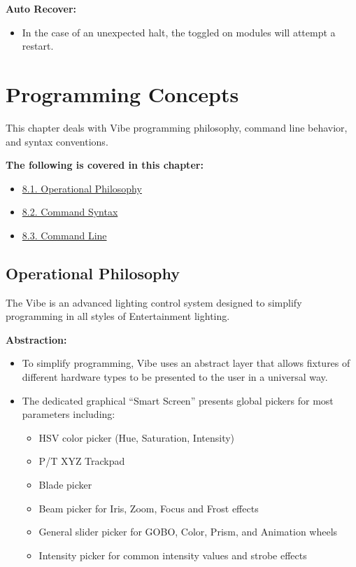 \documentclass[
]{article}
\providecommand{\tightlist}{%
  \setlength{\itemsep}{0pt}\setlength{\parskip}{0pt}}
\begin{document}
\textbf{Auto Recover:}

\begin{itemize}
\tightlist
\item
  In the case of an unexpected halt, the toggled on modules will attempt a restart.
\end{itemize}

\hypertarget{programming-concepts}{%
\section{Programming Concepts}\label{programming-concepts}}

This chapter deals with Vibe programming philosophy, command line behavior, and syntax conventions.

\textbf{The following is covered in this chapter:}

\begin{itemize}
\tightlist
\item
  \href{https://vibemanual.compulite.com/programming-concepts.html\#operational-philosophy}{8.1. Operational Philosophy}
\item
  \href{https://vibemanual.compulite.com/programming-concepts.html\#command-syntax}{8.2. Command Syntax}
\item
  \href{https://vibemanual.compulite.com/programming-concepts.html\#command-line}{8.3. Command Line}
\end{itemize}

\hypertarget{operational-philosophy}{%
\subsection{Operational Philosophy}\label{operational-philosophy}}

The Vibe is an advanced lighting control system designed to simplify programming in all styles of Entertainment lighting.

\textbf{Abstraction:}

\begin{itemize}
\item
  To simplify programming, Vibe uses an abstract layer that allows fixtures of different hardware types to be presented to the user in a universal way.
\item
  The dedicated graphical ``Smart Screen'' presents global pickers for most parameters including:

  \begin{itemize}
  \item
    HSV color picker (Hue, Saturation, Intensity)
  \item
    P/T XYZ Trackpad
  \item
    Blade picker
  \item
    Beam picker for Iris, Zoom, Focus and Frost effects
  \item
    General slider picker for GOBO, Color, Prism, and Animation wheels
  \item
    Intensity picker for common intensity values and strobe effects
  \end{itemize}
\end{itemize}
\end{document}
